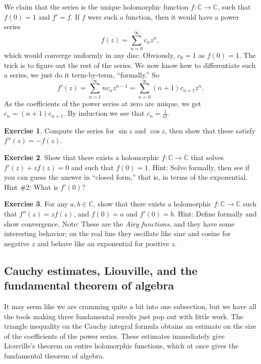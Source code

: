 \documentclass[12pt,openany]{book}
\newcommand{\C}{{\mathbb{C}}}
\newcommand{\myindex}[1]{#1\index{#1}}
\theoremstyle{plain}
\theoremstyle{remark}
\theoremstyle{definition}
\newenvironment{exbox}{%
    \def\FrameCommand{\vrule width 1pt \relax\hspace {10pt}}%
    \MakeFramed {\advance \hsize -\width \FrameRestore }%
}{%
    \endMakeFramed
}
\theoremstyle{exercise}
\newtheorem{exercise}{Exercise}[section]
\theoremstyle{example}
\begin{document}
We claim that the series is the unique holomorphic function $f \colon \C
\to \C$, such that $f(0)=1$ and $f' = f$.  If $f$ were such a function, then
it would have a power series
\begin{equation*}
f(z) = \sum_{n=0}^\infty c_n z^n ,
\end{equation*}
which would converge uniformly in any disc.  Obviously, $c_0 = 1$
as $f(0) = 1$.  The trick is to figure out the rest of the series.
We now know how to
differentiate such a series, we just do it term-by-term, ``formally.''
So
\begin{equation*}
f'(z) =
\sum_{n=1}^\infty n c_n z^{n-1} =
\sum_{n=0}^\infty (n+1) c_{n+1} z^{n} .
\end{equation*}
As the coefficients of the power series at zero are unique, we get
$c_n = (n+1) c_{n+1}$.  By induction we see that $c_n = \frac{1}{n!}$.

\begin{exbox}
\begin{exercise}
Compute the series for $\sin z$ and $\cos z$, then show that these satisfy
$f''(z) = -f(z)$.
\end{exercise}

\begin{exercise}
Show that there exists a holomorphic $f \colon \C \to \C$ that
solves $f'(z) + z f(z) = 0$ and such that $f(0) = 1$.  Hint: Solve formally,
then see if you can guess the answer in ``closed form,'' that is, in terms
of the exponential.  Hint \#2: What is $f'(0)$?
\end{exercise}

\begin{exercise}
For any $a,b \in \C$, show that there exists a holomorphic $f \colon \C \to
\C$ such that $f''(z) = z f(z)$, and $f(0) = a$ and $f'(0) = b$.
Hint: Define formally and show convergence.
Note: These are the \emph{\myindex{Airy functions}}, and they have some
interesting behavior; on the real line they oscillate like sine and cosine
for negative $z$ and behave like an exponential for positive $z$.
\end{exercise}
\end{exbox}

\subsection{Cauchy estimates, Liouville, and the fundamental theorem of
algebra}

It may seem like we are cramming quite a bit into one subsection, but
we have all the tools making three fundamental results just pop out
with little work.  The triangle inequality on
the Cauchy integral formula obtains an estimate on the size of the
coefficients of the power series.  These estimates immediately give
Liouville's theorem on entire holomorphic functions, which at once gives the
fundamental theorem of algebra.
\end{document}
